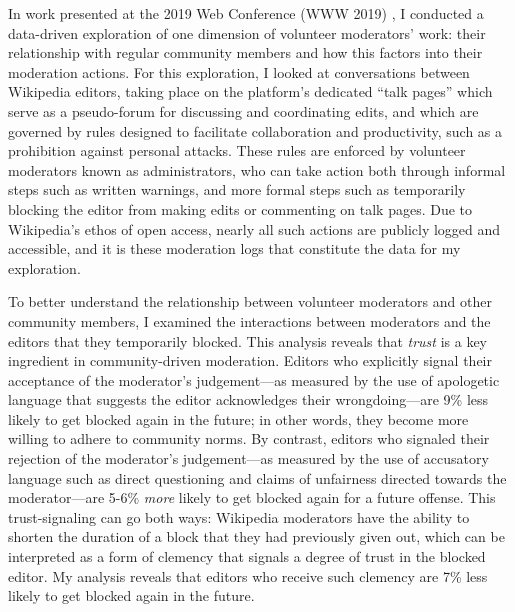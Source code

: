 \documentclass[11pt,letterpaper]{article}
\begin{document}
In work presented at the 2019 Web Conference (WWW 2019) \cite{chang_trajectories_2019}, I conducted a data-driven exploration of one dimension of volunteer moderators' work: their relationship with regular community members and how this factors into their moderation actions.
For this exploration, I looked at conversations between Wikipedia editors, taking place on the platform's dedicated ``talk pages'' which serve as a pseudo-forum for discussing and coordinating edits, and which are governed by rules designed to facilitate collaboration and productivity, such as a prohibition against personal attacks.
These rules are enforced by volunteer moderators known as administrators, who can take action both through informal steps such as written warnings, and more formal steps such as temporarily blocking the editor from making edits or commenting on talk pages.
Due to Wikipedia's ethos of open access, nearly all such actions are publicly logged and accessible, and it is these moderation logs that constitute the data for my exploration.

To better understand the relationship between volunteer moderators and other community members, I examined the interactions between moderators and the editors that they temporarily blocked.
This analysis reveals that \emph{trust} is a key ingredient in community-driven moderation.
Editors who explicitly signal their acceptance of the moderator's judgement---as measured by the use of apologetic language that suggests the editor acknowledges their wrongdoing---are 9\% less likely to get blocked again in the future; in other words, they become more willing to adhere to community norms.
By contrast, editors who signaled their rejection of the moderator's judgement---as measured by the use of accusatory language such as direct questioning and claims of unfairness directed towards the moderator---are 5-6\% \emph{more} likely to get blocked again for a future offense.
This trust-signaling can go both ways: Wikipedia moderators have the ability to shorten the duration of a block that they had previously given out, which can be interpreted as a form of clemency that signals a degree of trust in the blocked editor.
My analysis reveals that editors who receive such clemency are 7\% less likely to get blocked again in the future.
\end{document}
